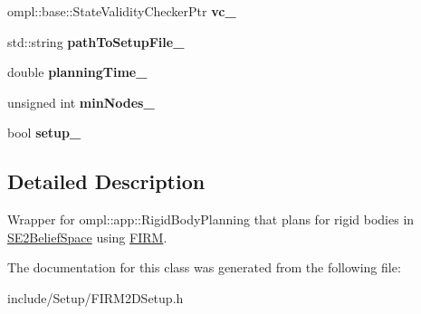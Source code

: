 \begin{DoxyCompactItemize}
\item 
\hypertarget{class_f_i_r_m2_d_setup_a1217ce796e4731cfd4397a38cb31629a}{ompl\-::base\-::\-State\-Validity\-Checker\-Ptr {\bfseries vc\-\_\-}}\label{class_f_i_r_m2_d_setup_a1217ce796e4731cfd4397a38cb31629a}

\item 
\hypertarget{class_f_i_r_m2_d_setup_a0a9c766120680ef9641e15150eb84943}{std\-::string {\bfseries path\-To\-Setup\-File\-\_\-}}\label{class_f_i_r_m2_d_setup_a0a9c766120680ef9641e15150eb84943}

\item 
\hypertarget{class_f_i_r_m2_d_setup_addc27c157777bd94155da543315a7dce}{double {\bfseries planning\-Time\-\_\-}}\label{class_f_i_r_m2_d_setup_addc27c157777bd94155da543315a7dce}

\item 
\hypertarget{class_f_i_r_m2_d_setup_aea609ab36aa32355738796834666a70d}{unsigned int {\bfseries min\-Nodes\-\_\-}}\label{class_f_i_r_m2_d_setup_aea609ab36aa32355738796834666a70d}

\item 
\hypertarget{class_f_i_r_m2_d_setup_a2ae4651d76fb0ab194801e1d0e2944c1}{bool {\bfseries setup\-\_\-}}\label{class_f_i_r_m2_d_setup_a2ae4651d76fb0ab194801e1d0e2944c1}

\end{DoxyCompactItemize}


\subsection{Detailed Description}
Wrapper for ompl\-::app\-::\-Rigid\-Body\-Planning that plans for rigid bodies in \hyperlink{class_s_e2_belief_space}{S\-E2\-Belief\-Space} using \hyperlink{class_f_i_r_m}{F\-I\-R\-M}. 

The documentation for this class was generated from the following file\-:\begin{DoxyCompactItemize}
\item 
include/\-Setup/F\-I\-R\-M2\-D\-Setup.\-h\end{DoxyCompactItemize}
